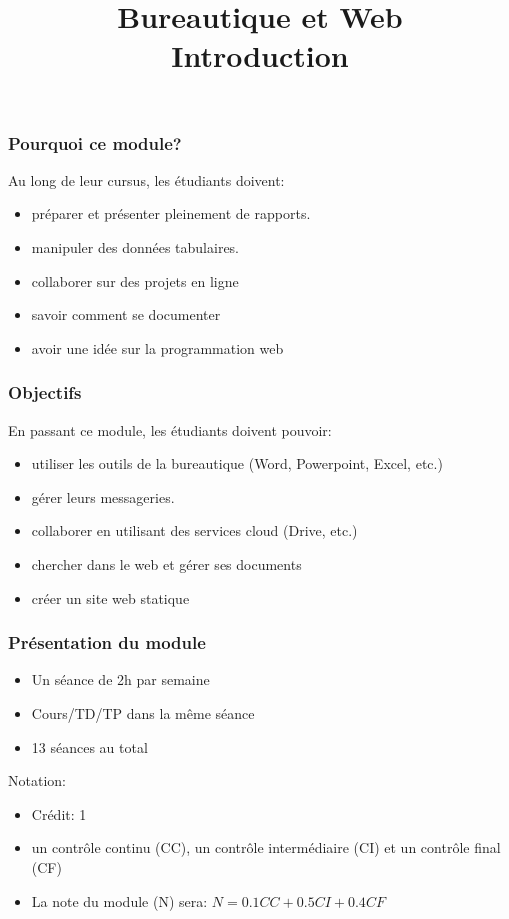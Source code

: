 \documentclass{beamer}
\title[BWEB: Introduction] %
{Bureautique et Web \\Introduction}
\begin{document}
\begin{frame}
\frametitle{Pourquoi ce module?}

Au long de leur cursus, les étudiants doivent:
\begin{itemize}
	\item préparer et présenter pleinement de rapports.
	\item manipuler des données tabulaires.
	\item collaborer sur des projets en ligne
	\item savoir comment se documenter
	\item avoir une idée sur la programmation web
\end{itemize}

\end{frame}


\begin{frame}
	\frametitle{Objectifs}
	En passant ce module, les étudiants doivent pouvoir:
	\begin{itemize}
		\item utiliser les outils de la bureautique (Word, Powerpoint, Excel, etc.)
		\item gérer leurs messageries.
		\item collaborer en utilisant des services cloud (Drive, etc.)
		\item chercher dans le web et gérer ses documents
		\item créer un site web statique
	\end{itemize}

\end{frame}


\begin{frame}
\frametitle{Présentation du module}

\begin{itemize}
	\item Un séance de 2h par semaine
	\item Cours/TD/TP dans la même séance  
	\item 13 séances au total
\end{itemize}

Notation:
\begin{itemize}
	\item Crédit: 1
	\item un contrôle continu (CC), un contrôle intermédiaire (CI) et un contrôle final (CF)
	\item La note du module (N) sera: $ N = 0.1 CC + 0.5 CI + 0.4 CF$
\end{itemize}

\end{frame}
\end{document}
